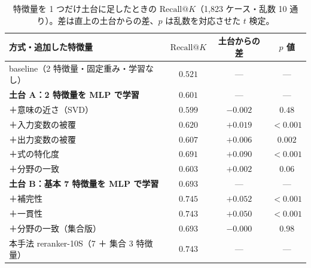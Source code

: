 \documentclass[11pt,a4paper]{ltjsarticle}
\makeatletter
\newcommand{\rk}{\textrm{Recall@}K}
\makeatother
\begin{document}
\begin{table}[h]\centering
\small
\caption{特徴量を 1 つだけ土台に足したときの $\rk$（1{,}823 ケース・乱数 10 通り）。差は直上の土台からの差、$p$ は乱数を対応させた $t$ 検定。}
\label{tab:ablation}
\begin{tabular}{lccc}
\toprule
方式・追加した特徴量 & $\rk$ & 土台からの差 & $p$ 値 \\
\midrule
baseline（2 特徴量・固定重み・学習なし） & $0.521$ & — & — \\
\midrule
\textbf{土台 A：2 特徴量を MLP で学習} & $0.601$ & — & — \\
\quad ＋意味の近さ（SVD） & $0.599$ & $-0.002$ & $0.48$ \\
\quad ＋入力変数の被覆 & $0.620$ & $+0.019$ & $<0.001$ \\
\quad ＋出力変数の被覆 & $0.607$ & $+0.006$ & $0.002$ \\
\quad ＋式の特化度 & $\mathbf{0.691}$ & $\mathbf{+0.090}$ & $<0.001$ \\
\quad ＋分野の一致 & $0.603$ & $+0.002$ & $0.06$ \\
\midrule
\textbf{土台 B：基本 7 特徴量を MLP で学習} & $0.693$ & — & — \\
\quad ＋補完性 & $0.745$ & $+0.052$ & $<0.001$ \\
\quad ＋一貫性 & $0.743$ & $+0.050$ & $<0.001$ \\
\quad ＋分野の一致（集合版） & $0.693$ & $-0.000$ & $0.98$ \\
\midrule
本手法 reranker-10S（7 ＋ 集合 3 特徴量） & $0.743$ & — & — \\
\bottomrule
\end{tabular}
\end{table}
\end{document}
